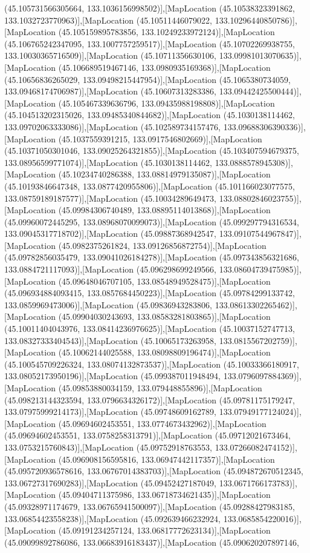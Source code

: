 (45.105731566305664, 133.1036156998502)],[MapLocation (45.10538323391862, 133.1032723770963)],[MapLocation (45.10511446079022, 133.10296440850786)],[MapLocation (45.105159895783856, 133.10249233972124)],[MapLocation (45.106765242347095, 133.1007757259517)],[MapLocation (45.10702269938755, 133.10030365716509)],[MapLocation (45.10711356630106, 133.09981013070635)],[MapLocation (45.106689519467146, 133.0980935169368)],[MapLocation (45.10656836265029, 133.09498215447954)],[MapLocation (45.1065380734059, 133.09468174706987)],[MapLocation (45.10607313283386, 133.09442425500444)],[MapLocation (45.105467339636796, 133.09435988198808)],[MapLocation (45.104513202315026, 133.09485340844682)],[MapLocation (45.1030138114462, 133.09702063333086)],[MapLocation (45.102589734157476, 133.09688306390336)],[MapLocation (45.1037559391215, 133.0917546802669)],[MapLocation (45.10371050301046, 133.09025264321855)],[MapLocation (45.103407594679375, 133.08956599771074)],[MapLocation (45.1030138114462, 133.0888578945308)],[MapLocation (45.10234740286388, 133.08814979135087)],[MapLocation (45.10193846647348, 133.0877420955806)],[MapLocation (45.101166023077575, 133.08759189187577)],[MapLocation (45.10034289649473, 133.08802846023755)],[MapLocation (45.09984306740489, 133.08895114013868)],[MapLocation (45.09960072445295, 133.08968070099073)],[MapLocation (45.099297794316534, 133.09045317718702)],[MapLocation (45.09887368942547, 133.09107544967847)],[MapLocation (45.0982375261824, 133.09126856872754)],[MapLocation (45.09782856035479, 133.09041026184278)],[MapLocation (45.097343856321686, 133.0884721117093)],[MapLocation (45.096298699249566, 133.08604739475985)],[MapLocation (45.09648046707105, 133.08548949528475)],[MapLocation (45.096934884093415, 133.0857684450223)],[MapLocation (45.09784299133742, 133.0859969473006)],[MapLocation (45.09836943283806, 133.08613302265462)],[MapLocation (45.09904030243693, 133.08583281803865)],[MapLocation (45.10011404043976, 133.08414236976625)],[MapLocation (45.10037152747713, 133.08327333404543)],[MapLocation (45.10065173263958, 133.0815567202759)],[MapLocation (45.10062144025588, 133.08098809196474)],[MapLocation (45.100545709226324, 133.08074132873537)],[MapLocation (45.10033366180917, 133.08052173950196)],[MapLocation (45.099387011948494, 133.0796097884369)],[MapLocation (45.09853880034159, 133.079448855896)],[MapLocation (45.098213144323594, 133.0796634326172)],[MapLocation (45.09781175179247, 133.07975999214173)],[MapLocation (45.09748609162789, 133.07949177124024)],[MapLocation (45.09694602453551, 133.0774673432962)],[MapLocation (45.09694602453551, 133.0758258313791)],[MapLocation (45.09712021673464, 133.0753215760843)],[MapLocation (45.09752918763553, 133.07266082474152)],[MapLocation (45.096908156595816, 133.06947442117357)],[MapLocation (45.095720936578616, 133.06767014383703)],[MapLocation (45.094872670512345, 133.06727317690283)],[MapLocation (45.09452427187049, 133.0671766173783)],[MapLocation (45.09404711375986, 133.06718734621435)],[MapLocation (45.09328971174679, 133.06765941500097)],[MapLocation (45.09288427983185, 133.06854423558238)],[MapLocation (45.092639466232924, 133.0685854220016)],[MapLocation (45.09191234257124, 133.06817772623134)],[MapLocation (45.09099892786086, 133.06683916183437)],[MapLocation (45.090620207897146, 